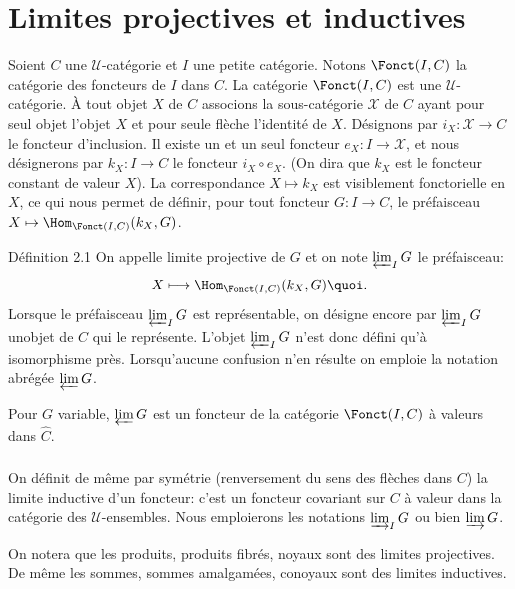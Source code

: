 \section{Limites projectives et inductives}

Soient $C$ une $𝒰$-catégorie et $I$ une petite catégorie.
Notons $\Fonct(I,C)$ la catégorie des foncteurs de $I$ dans $C$. La
catégorie $\Fonct(I,C)$ est une $𝒰$-catégorie. À tout objet
$X$ de $C$ associons la sous-catégorie $𝒳$ de $C$ ayant pour
seul objet l'objet $X$ et pour seule flèche l'identité de $X$.
Désignons par $i_X:𝒳\rightarrow C$ le foncteur d'inclusion.
Il existe un et un seul foncteur $e_X:I\rightarrow 𝒳$, et
nous désignerons par $k_X:I\rightarrow C$ le foncteur $i_X\circ
e_X$. (On dira que $k_X$ est le foncteur constant de valeur $X$). La
correspondance $X\mapsto k_X$ est visiblement fonctorielle en $X$,
ce qui nous permet de définir, pour tout foncteur $G:I\rightarrow
C$, le préfaisceau $X\mapsto \Hom_{\Fonct(I,C)}(k_X,G)$.

\begin{enonce*}{Définition 2.1}
On appelle limite projective de $G$ et on note $\varprojlim_I G$ le
préfaisceau:
$$
X\longmapsto \Hom_{\Fonct(I,C)}(k_X,G){\quoi}.
$$
Lorsque le préfaisceau $\varprojlim_I G$ est représentable, on
désigne encore par $\varprojlim_I G$ un\pageoriginale objet de $C$
qui le représente. L'objet $\varprojlim_I G$ n'est donc défini qu'à
isomorphisme près. Lorsqu'aucune confusion n'en résulte on emploie
la notation abrégée $\varprojlim G$.
\end{enonce*}

Pour $G$ variable, $\varprojlim G$ est un foncteur de la catégorie
$\Fonct(I,C)$ à valeurs dans $\widehat{C}$.

\setcounter{subsection}{1} \setcounter{subsubsection}{0}
\subsubsection{}
On définit de même par symétrie (renversement du sens des flèches
dans $C$) la limite inductive d'un foncteur: c'est un foncteur
covariant sur $C$ à valeur dans la catégorie des
$𝒰$-ensembles. Nous emploierons les notations $\varinjlim_I
G$ ou bien $\varinjlim G$.

On notera que les produits, produits fibrés, noyaux sont des limites
projectives. De même les sommes, sommes amalgamées, conoyaux sont
des %
limites inductives.

